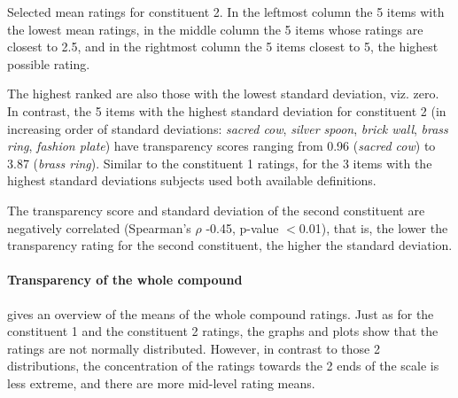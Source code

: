 \begin{table}[!htb]
  \caption{Selected mean ratings for constituent 2. In the leftmost column the 5 items with the lowest mean ratings, in the middle column the 5 items whose ratings are closest to 2.5, and in the rightmost column the 5 items closest to 5, the highest possible rating.}
  \label{tab:constituent2-ratings}
\end{table}

\newpage
The highest ranked are also those with the lowest
standard deviation, viz. zero. In contrast, the 5 items with the highest
standard deviation for constituent 2 (in increasing order of
standard deviations: \emph{sacred cow}, \emph{silver spoon},
\emph{brick wall}, \emph{brass ring}, \emph{fashion plate}) have transparency scores ranging
from 0.96 (\emph{sacred cow}) to 3.87 (\emph{brass ring}). Similar to
the constituent 1 ratings, for the 3 items with the highest standard
deviations subjects used both available definitions.

The transparency score and standard deviation of the second constituent are negatively
correlated (Spearman's $\rho$ -0.45, p-value $<$0.01), that is, the
lower the transparency rating for the second constituent, the higher
the standard deviation.

 
\paragraph{Transparency of the whole compound}

 gives an overview of the
means of the whole compound ratings. Just
as for the constituent 1 and the constituent 2 ratings,  the graphs
and plots show that the ratings are not normally distributed. However,
in contrast to those 2 distributions, the concentration of the ratings
towards the 2 ends of the scale is less extreme, and there are more
mid-level rating means.

